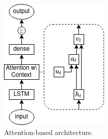 \vspace{-6pt}
\begin{figure}[H]
    \includegraphics[width=0.55\linewidth]{II_Body/LSTM/images/AttenrionDrawing.jpg}
    \caption{Attention-based architecture.}
    \label{fig:attention}
\end{figure}
%

